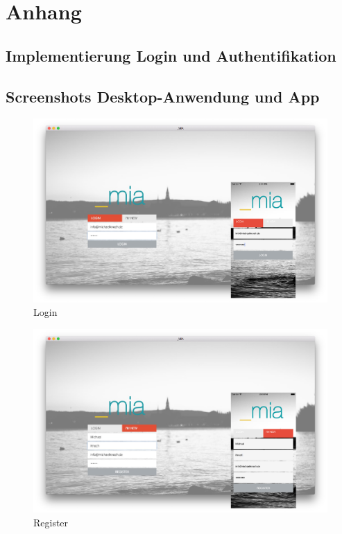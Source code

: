 
\appendix
\chapter{Anhang}
\section{Implementierung Login und Authentifikation}




\newpage
\section{Screenshots Desktop-Anwendung und App}
\label{screens}

\begin{figure}[h!p]
 \centering
 \includegraphics[width=0.9\linewidth]{appendix/app/login.png}
 \caption{Login}
\end{figure}

\begin{figure}[h!p]
 \centering
 \includegraphics[width=0.9\linewidth]{appendix/app/register.png}
 \caption{Register}
\end{figure}

